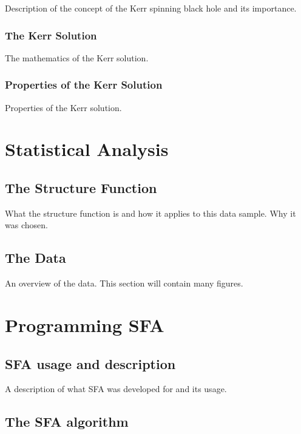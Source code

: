 \documentclass[12pt, oneside]{smuthesis}
\begin{document}
Description of the concept of the Kerr spinning black hole and its importance.

\subsection{\sc The Kerr Solution} \label{kerrSolution}

The mathematics of the Kerr solution.

\subsection{\sc Properties of the Kerr Solution} \label{kerrSolutionProperties}

Properties of the Kerr solution.

\chapter{\sc Statistical Analysis} \label{statisticalAnalysis}

\section{\sc The Structure Function} \label{structureFunction}

\citep{collier2001}
What the structure function is and how it applies to this data sample. Why it was chosen.

\section{\sc The Data} \label{theData}

An overview of the data. This section will contain many figures.

\chapter{\sc Programming SFA} \label{programmingSFA}

\section{\sc SFA usage and description} \label{usageDescription}

A description of what SFA was developed for and its usage.

\section{\sc The SFA algorithm} \label{algorithm}
\end{document}
